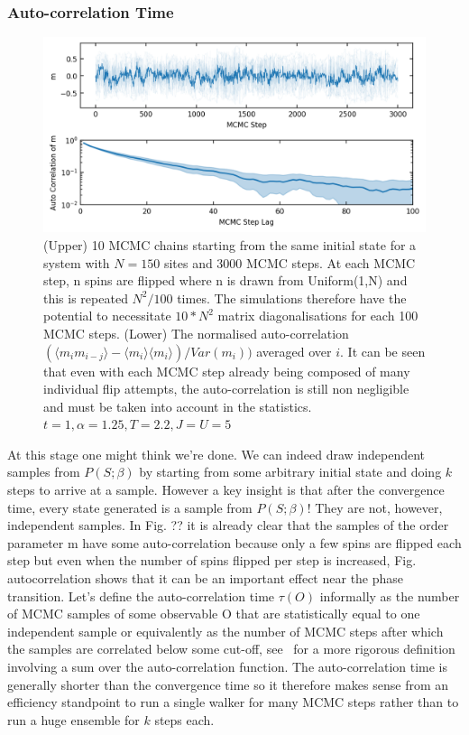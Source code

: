 \hypertarget{app-mcmc-autocorrelation}{%
\subsubsection{Auto-correlation Time}\label{app-mcmc-autocorrelation}}

\hypertarget{fig:m_autocorr}{%
\begin{figure}
\centering
\includegraphics[width=1\textwidth,height=\textheight]{figure_code/fk_chapter/lsr/figs/m_autocorr.png}
\caption[{no title}]{(Upper) 10 MCMC chains starting from the same initial state for a system with \(N = 150\) sites and 3000 MCMC steps. At each MCMC step, n spins are flipped where n is drawn from Uniform(1,N) and this is repeated \(N^2/100\) times. The simulations therefore have the potential to necessitate \(10*N^2\) matrix diagonalisations for each 100 MCMC steps. (Lower) The normalised auto-correlation \((\langle m_i m_{i-j}\rangle - \langle m_i\rangle \langle m_i \rangle) / Var(m_i))\) averaged over \(i\). It can be seen that even with each MCMC step already being composed of many individual flip attempts, the auto-correlation is still non negligible and must be taken into account in the statistics. \(t = 1, \alpha = 1.25, T = 2.2, J = U = 5\)}
\label{fig:m_autocorr}
\end{figure}
}

At this stage one might think we're done. We can indeed draw independent samples from \(P(S; \beta)\) by starting from some arbitrary initial state and doing \(k\) steps to arrive at a sample. However a key insight is that after the convergence time, every state generated is a sample from \(P(S; \beta)\)! They are not, however, independent samples. In Fig. ?? it is already clear that the samples of the order parameter m have some auto-correlation because only a few spins are flipped each step but even when the number of spins flipped per step is increased, Fig. autocorrelation shows that it can be an important effect near the phase transition. Let's define the auto-correlation time \(\tau(O)\) informally as the number of MCMC samples of some observable O that are statistically equal to one independent sample or equivalently as the number of MCMC steps after which the samples are correlated below some cut-off, see~\autocite{krauthIntroductionMonteCarlo1996} for a more rigorous definition involving a sum over the auto-correlation function. The auto-correlation time is generally shorter than the convergence time so it therefore makes sense from an efficiency standpoint to run a single walker for many MCMC steps rather than to run a huge ensemble for \(k\) steps each.

